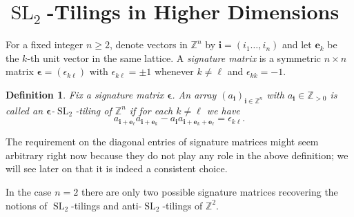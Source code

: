 \documentclass[12pt]{amsart}
\newtheorem{definition}[theorem]{Definition}
\newcommand{\bepsilon}{\boldsymbol{\epsilon}}
\newcommand{\be}{\boldsymbol{e}}
\newcommand{\bi}{\boldsymbol{i}}
\newcommand{\SL}{\operatorname{SL}}
\newcommand{\ZZ}{\mathbb{Z}}
\begin{document}
\section{$\SL_2$-Tilings in Higher Dimensions}
  For a fixed integer $n\geq 2$, denote vectors in $\ZZ^n$ by $\bi=(i_1\dots,i_n)$ and let $\be_k$ be the $k$-th unit vector in the same lattice.
  A \emph{signature matrix} is a symmetric $n\times n$ matrix $\bepsilon=(\epsilon_{k\ell})$ with $\epsilon_{k\ell}=\pm 1$ whenever $k\neq \ell$ and $\epsilon_{kk}=-1$. 
  \begin{definition}
    Fix a signature matrix $\bepsilon$.  
    An array $(a_{\bi})_{\bi\in\ZZ^n}$ with $a_{\bi}\in\ZZ_{>0}$ is called an \emph{$\bepsilon$-$\SL_2$-tiling of $\ZZ^n$} if for each $k \neq\ell$ we have
    \begin{equation}\label{eq:higher sl2 recursion}
      a_{\bi+\be_\ell}a_{\bi+\be_k}-a_{\bi}a_{\bi+\be_k+\be_\ell}=\epsilon_{k\ell}.
    \end{equation}
  \end{definition}
  The requirement on the diagonal entries of signature matrices might seem arbitrary right now because they do not play any role in the above definition; we will see later on that it is indeed a consistent choice.
  
  In the case $n=2$ there are only two possible signature matrices recovering the notions of $\SL_2$-tilings and anti-$\SL_2$-tilings of $\ZZ^2$. 
  
\end{document}
